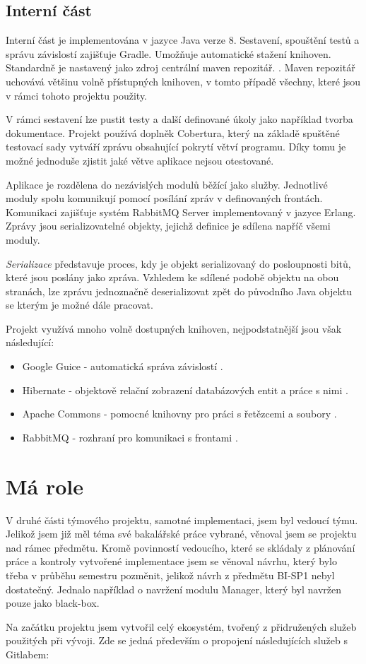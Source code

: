 \documentclass[thesis=B,czech]{FITthesis}[2012/06/26]
\begin{document}
\subsection{Interní část}
Interní část je implementována v jazyce Java verze 8. Sestavení, spouštění testů a správu závislostí zajišťuje Gradle\cite{gradle}.
Umožňuje automatické stažení knihoven. Standardně je nastavený jako zdroj
centrální maven repozitář. \cite{mavenRepo}. Maven repozitář uchovává většinu volně přístupných knihoven, v tomto případě všechny, které jsou v rámci tohoto projektu použity.
\par
V rámci sestavení lze pustit testy a další definované úkoly jako například tvorba dokumentace. Projekt používá
doplněk Cobertura\cite{cobertura}, který na základě spuštěné testovací sady vytváří zprávu obsahující pokrytí větví programu.
Díky tomu je možné jednoduše zjistit jaké větve aplikace nejsou otestované.
\par
Aplikace je rozdělena do nezávislých modulů běžící jako služby. Jednotlivé moduly spolu komunikují
pomocí posílání zpráv v definovaných frontách. Komunikaci zajišťuje systém RabbitMQ Server\cite{rabbitMQ} implementovaný v jazyce Erlang. Zprávy jsou serializovatelné objekty, jejichž definice je sdílena napříč všemi moduly.
\par
\textit{Serializace} představuje proces, kdy je objekt serializovaný do posloupnosti bitů, které jsou poslány jako zpráva. 
Vzhledem ke sdílené podobě objektu na obou stranách, lze zprávu jednoznačně deserializovat zpět do původního Java objektu se kterým
je možné dále pracovat.\cite{serialization}
\par
Projekt využívá mnoho volně dostupných knihoven, nejpodstatnější jsou však následující:
\begin{itemize}
\item Google Guice - automatická správa závislostí \cite{guice}.
\item Hibernate - objektově relační zobrazení databázových entit a práce s nimi \cite{hibernate}.
\item Apache Commons - pomocné knihovny pro práci s řetězcemi a soubory \cite{commons}.
\item RabbitMQ - rozhraní pro komunikaci s frontami \cite{rabbitMQ}.
\end{itemize}

\section{Má role}
V druhé části týmového projektu, samotné implementaci, jsem byl vedoucí týmu. Jelikož jsem již měl téma své bakalářské práce vybrané, 
věnoval jsem se projektu nad rámec předmětu. Kromě povinností vedoucího, které se skládaly z plánování práce a kontroly vytvořené implementace
jsem se věnoval návrhu, který bylo třeba v průběhu semestru pozměnit, jelikož návrh z předmětu BI-SP1 nebyl dostatečný. Jednalo například
o navržení modulu Manager, který byl navržen pouze jako black-box.
\par
Na začátku projektu jsem vytvořil celý ekosystém, tvořený z přidružených služeb použitých při vývoji.
Zde se jedná především o propojení následujících služeb s Gitlabem:
\end{document}

